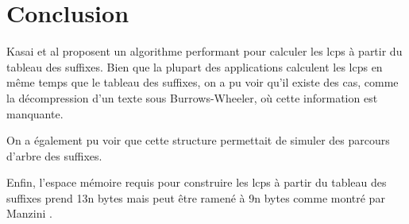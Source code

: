 \documentclass[a4paper,10pt]{article}
\begin{document}
\section{Conclusion}
\label{sec:conclusion}


Kasai et al proposent un algorithme performant pour calculer les lcps
à partir du tableau des suffixes. Bien que la plupart des applications
calculent les lcps en même temps que le tableau des suffixes, on a pu
voir qu'il existe des cas, comme la décompression d'un texte sous
Burrows-Wheeler, où cette information est manquante.

On a également pu voir que cette structure permettait de simuler des
parcours d'arbre des suffixes.

Enfin, l'espace mémoire requis pour construire les lcps à partir du
tableau des suffixes prend 13n bytes mais peut être ramené à 9n bytes
comme montré par Manzini \cite{Manzini04}.




\end{document}
